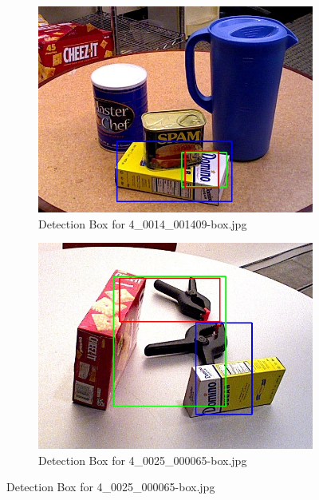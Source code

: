 \documentclass[10.5pt,a4paper]{article}
\begin{document}
\begin{figure}[h]
    \vspace{2em}

    \begin{subfigure}{0.45\textwidth}
        \centering
        \includegraphics[width=\textwidth]{img/4_0014_001409-box.jpg}
        \caption{Detection Box for 4\_0014\_001409-box.jpg}
        \label{fig:img3}
    \end{subfigure}
    \hfill
    \begin{subfigure}{0.45\textwidth}
        \centering
        \includegraphics[width=\textwidth]{img/4_0025_000065-box.jpg}
        \caption{Detection Box for 4\_0025\_000065-box.jpg}
        \label{fig:img4}
    \end{subfigure}


\end{figure}
\end{document}
